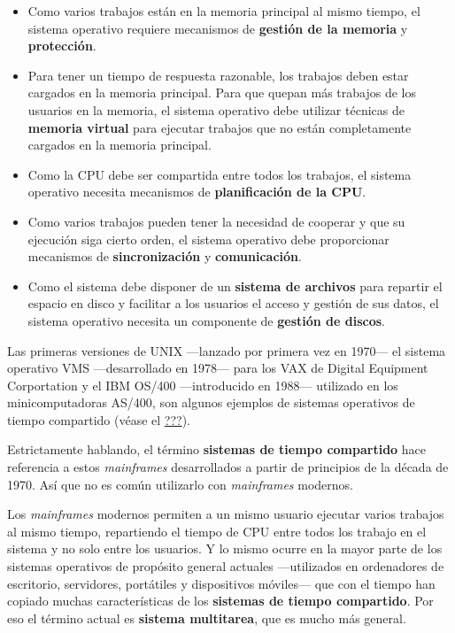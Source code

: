 \begin{itemize}
\item
  Como varios trabajos están en la memoria principal al mismo tiempo, el
  sistema operativo requiere mecanismos de \textbf{gestión de la
  memoria} y \textbf{protección}.
\item
  Para tener un tiempo de respuesta razonable, los trabajos deben estar
  cargados en la memoria principal. Para que quepan más trabajos de los
  usuarios en la memoria, el sistema operativo debe utilizar técnicas de
  \textbf{memoria virtual} para ejecutar trabajos que no están
  completamente cargados en la memoria principal.
\item
  Como la CPU debe ser compartida entre todos los trabajos, el sistema
  operativo necesita mecanismos de \textbf{planificación de la CPU}.
\item
  Como varios trabajos pueden tener la necesidad de cooperar y que su
  ejecución siga cierto orden, el sistema operativo debe proporcionar
  mecanismos de \textbf{sincronización} y \textbf{comunicación}.
\item
  Como el sistema debe disponer de un \textbf{sistema de archivos} para
  repartir el espacio en disco y facilitar a los usuarios el acceso y
  gestión de sus datos, el sistema operativo necesita un componente de
  \textbf{gestión de discos}.
\end{itemize}

Las primeras versiones de UNIX ---lanzado por primera vez en 1970--- el
sistema operativo VMS ---desarrollado en 1978--- para los VAX de Digital
Equipment Corportation y el IBM OS/400 ---introducido en 1988---
utilizado en los minicomputadoras AS/400, son algunos ejemplos de
sistemas operativos de tiempo compartido (véase el
\hyperref[sect-historia-tercera-generaciuxf3n]{???}).

Estrictamente hablando, el término \textbf{sistemas de tiempo
compartido} hace referencia a estos \emph{mainframes} desarrollados a
partir de principios de la década de 1970. Así que no es común
utilizarlo con \emph{mainframes} modernos.

Los \emph{mainframes} modernos permiten a un mismo usuario ejecutar
varios trabajos al mismo tiempo, repartiendo el tiempo de CPU entre
todos los trabajo en el sistema y no solo entre los usuarios. Y lo mismo
ocurre en la mayor parte de los sistemas operativos de propósito general
actuales ---utilizados en ordenadores de escritorio, servidores,
portátiles y dispositivos móviles--- que con el tiempo han copiado
muchas características de los \textbf{sistemas de tiempo compartido}.
Por eso el término actual es \textbf{sistema multitarea}, que es mucho
más general.


